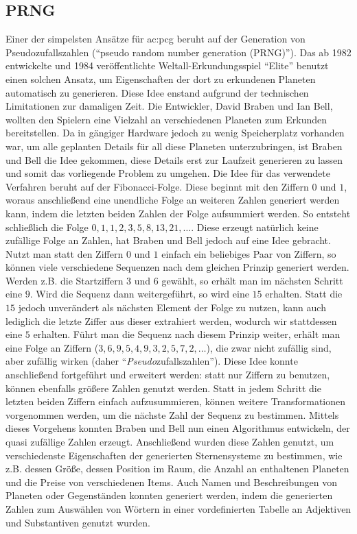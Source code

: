 \subsection{PRNG}
Einer der simpelsten Ansätze für \gls{ac:pcg} beruht auf der Generation von Pseudozufallszahlen (``pseudo random number
generation (PRNG)''). \cite{25_hendrikx_et_al} Das ab 1982 entwickelte und 1984 veröffentlichte Weltall-Erkundungsspiel ``Elite''
benutzt einen solchen Ansatz, um Eigenschaften der dort zu erkundenen Planeten automatisch zu generieren. \cite{36_spufford}
Diese Idee enstand aufgrund der technischen Limitationen zur damaligen Zeit. Die Entwickler, David Braben und Ian Bell, wollten den Spielern
eine Vielzahl an verschiedenen Planeten zum Erkunden bereitstellen. Da in gängiger Hardware jedoch zu wenig Speicherplatz vorhanden war,
um alle geplanten Details für all diese Planeten unterzubringen, ist Braben und Bell die Idee gekommen, diese Details erst zur Laufzeit
generieren zu lassen und somit das vorliegende Problem zu umgehen. Die Idee für das verwendete Verfahren beruht auf der Fibonacci-Folge.
Diese beginnt mit den Ziffern \(0\)
und \(1\), woraus anschließend eine unendliche Folge an weiteren Zahlen generiert werden kann, indem die letzten beiden Zahlen der Folge
aufsummiert werden. So entsteht schließlich die Folge \(0, 1, 1, 2, 3, 5, 8, 13, 21, \dots\). Diese erzeugt natürlich keine zufällige Folge
an Zahlen, hat Braben und Bell jedoch auf eine Idee gebracht. Nutzt man statt den Ziffern \(0\) und \(1\) einfach ein beliebiges
Paar von Ziffern, so können viele verschiedene Sequenzen nach dem gleichen Prinzip generiert werden. Werden z.B. die Startziffern \(3\)
und \(6\) gewählt, so erhält man im nächsten Schritt eine \(9\). Wird die Sequenz dann weitergeführt, so wird eine \(15\) erhalten. Statt
die \(15\) jedoch unverändert als nächsten Element der Folge zu nutzen, kann auch lediglich die letzte Ziffer aus dieser extrahiert werden,
wodurch wir stattdessen eine \(5\) erhalten. Führt man die Sequenz nach diesem Prinzip weiter, erhält man eine Folge an Ziffern
(\(3, 6, 9, 5, 4, 9, 3, 2, 5, 7, 2, \dots\)), die zwar nicht zufällig sind, aber zufällig wirken (daher ``\textit{Pseudo}zufallszahlen'').
Diese Idee konnte anschließend fortgeführt und erweitert werden: statt nur Ziffern zu benutzen, können ebenfalls größere Zahlen genutzt werden.
Statt in jedem Schritt die letzten beiden Ziffern einfach aufzusummieren, können weitere Transformationen vorgenommen werden, um die nächste
Zahl der Sequenz zu bestimmen. Mittels dieses Vorgehens konnten Braben und Bell nun einen Algorithmus entwickeln, der quasi zufällige Zahlen
erzeugt. Anschließend wurden diese Zahlen genutzt, um verschiedenste Eigenschaften der generierten Sternensysteme zu bestimmen, wie z.B. dessen Größe,
dessen Position im Raum, die Anzahl an enthaltenen Planeten und die Preise von verschiedenen Items. Auch Namen und Beschreibungen von Planeten
oder Gegenständen konnten generiert werden, indem die generierten Zahlen zum Auswählen von Wörtern in einer vordefinierten Tabelle an Adjektiven
und Substantiven genutzt wurden. \cite{36_spufford}

